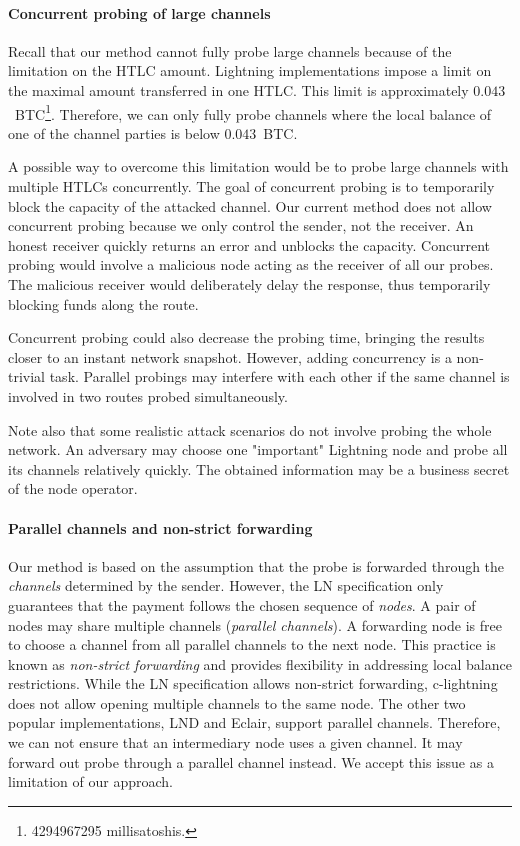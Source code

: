 \paragraph{Concurrent probing of large channels}

Recall that our method cannot fully probe large channels because of the limitation on the HTLC amount.
Lightning implementations impose a limit on the maximal amount transferred in one HTLC\@.
This limit is approximately $0.043$~BTC\footnote{4294967295 millisatoshis.}.
Therefore, we can only fully probe channels where the local balance of one of the channel parties is below $0.043$~BTC\@.

A possible way to overcome this limitation would be to probe large channels with multiple HTLCs concurrently.
The goal of concurrent probing is to temporarily block the capacity of the attacked channel.
Our current method does not allow concurrent probing because we only control the sender, not the receiver.
An honest receiver quickly returns an error and unblocks the capacity.
Concurrent probing would involve a malicious node acting as the receiver of all our probes.
The malicious receiver would deliberately delay the response, thus temporarily blocking funds along the route.

Concurrent probing could also decrease the probing time, bringing the results closer to an instant network snapshot.
However, adding concurrency is a non-trivial task.
Parallel probings may interfere with each other if the same channel is involved in two routes probed simultaneously.

Note also that some realistic attack scenarios do not involve probing the whole network.
An adversary may choose one "important" Lightning node and probe all its channels relatively quickly.
The obtained information may be a business secret of the node operator.

\paragraph{Parallel channels and non-strict forwarding}

Our method is based on the assumption that the probe is forwarded through the \textit{channels} determined by the sender.
However, the LN specification only guarantees that the payment follows the chosen sequence of \textit{nodes}.
A pair of nodes may share multiple channels (\textit{parallel channels}).
A forwarding node is free to choose a channel from all parallel channels to the next node.
This practice is known as \textit{non-strict forwarding} and provides flexibility in addressing local balance restrictions.
While the LN specification allows non-strict forwarding, c-lightning does not allow opening multiple channels to the same node.
The other two popular implementations, LND and Eclair, support parallel channels.
Therefore, we can not ensure that an intermediary node uses a given channel.
It may forward out probe through a parallel channel instead.
We accept this issue as a limitation of our approach.

